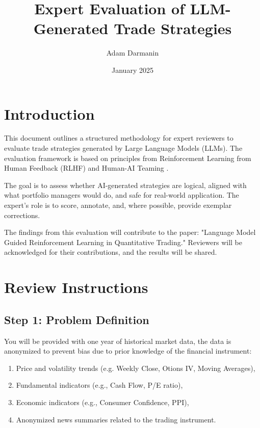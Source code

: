 \documentclass[8pt]{scrartcl}
\title{Expert Evaluation of LLM-Generated Trade Strategies}
\author{Adam Darmanin}
\date{January 2025}
\begin{document}
\maketitle

\section{Introduction}

This document outlines a structured methodology for expert reviewers to evaluate trade strategies generated by Large Language Models (LLMs). The evaluation framework is based on principles from Reinforcement Learning from Human Feedback (RLHF) \citep{Retzlaff2024HumanintheLoopRL} and Human-AI Teaming \citep{vats2024surveyhumanaiteaminglarge, xie2024text2rewardrewardshapinglanguage}.

The goal is to assess whether AI-generated strategies are logical, aligned with what portfolio managers would do, and safe for real-world application. The expert’s role is to score, annotate, and, where possible, provide exemplar corrections.

The findings from this evaluation will contribute to the paper: "Language Model Guided Reinforcement Learning in Quantitative Trading." Reviewers will be acknowledged for their contributions, and the results will be shared.

\section{Review Instructions}

\subsection{Step 1: Problem Definition}

You will be provided with one year of historical market data, the data is anonymized to prevent bias due to prior knowledge of the financial instrument:
\begin{enumerate}
    \item Price and volatility trends (e.g. Weekly Close, Otions IV, Moving Averages),
    \item Fundamental indicators (e.g., Cash Flow, P/E ratio),
    \item Economic indicators (e.g., Consumer Confidence, PPI),
    \item Anonymized news summaries related to the trading instrument.
\end{enumerate}
\end{document}
